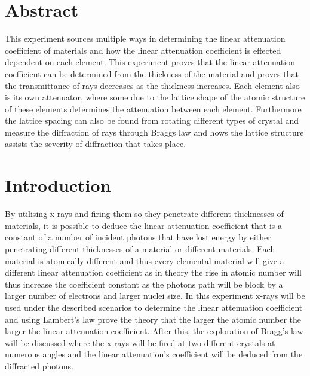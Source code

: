 \documentclass[12pt]{article}
\begin{document}
\section{Abstract}
\label{Abstract Section}

This experiment sources multiple ways in determining the linear attenuation coefficient of materials and how the linear attenuation coefficient is effected dependent on each element. This experiment proves that the linear attenuation coefficient can be determined from the thickness of the material and proves that the transmittance of rays decreases as the thickness increases. Each element also is its own attenuator, where some due to the lattice shape of the atomic structure of these elements determines the attenuation between each element. Furthermore the lattice spacing can also be found from rotating different types of crystal and measure the diffraction of rays through Braggs law and hows the lattice structure assists the severity of diffraction that takes place.

\section{Introduction}
\label{Introduction Section}

By utilising x-rays and firing them so they penetrate different thicknesses of materials, it is possible to deduce the linear attenuation coefficient that is a constant of a number of incident photons that have lost energy by either penetrating different thicknesses of a material or different materials. Each material is atomically different and thus every elemental material will give a different linear attenuation coefficient as in theory the rise in atomic number will thus increase the coefficient constant as the photons path will be block by a larger number of electrons and larger nuclei size. In this experiment x-rays will be used under the described scenarios to determine the linear attenuation coefficient and using Lambert's law prove the theory that the larger the atomic number the larger the linear attenuation coefficient. After this, the exploration of Bragg's law will be discussed where the x-rays will be fired at two different crystals at numerous angles and the linear attenuation's coefficient will be deduced from the diffracted photons. \\
\end{document}
